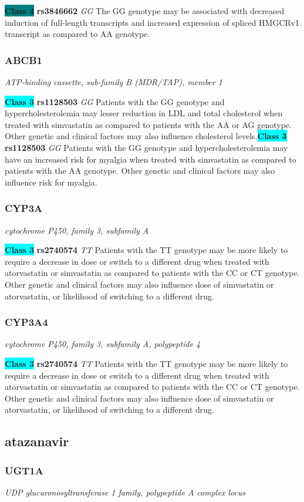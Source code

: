 \documentclass{report}
\begin{document}
\textbf{\colorbox{teal} {Class 4}} \textbf{ rs3846662 } \textit{ GG }
The GG genotype may be associated with decreased induction of full-length transcripts and increased expression of spliced HMGCRv1 transcript  as compared to AA genotype.\newline\subsubsection{ ABCB1 }
\textit{ ATP-binding cassette, sub-family B (MDR/TAP), member 1 }

\textbf{\colorbox{cyan} {Class 3}} \textbf{ rs1128503 } \textit{ GG }
Patients with the GG genotype and hypercholesterolemia may lesser reduction in LDL and total cholesterol when treated with simvastatin as compared to patients with the AA or AG genotype. Other genetic and clinical factors may also influence cholesterol levels.\newline\textbf{\colorbox{cyan} {Class 3}} \textbf{ rs1128503 } \textit{ GG }
Patients with the GG genotype and hypercholesterolemia may have an increased risk for myalgia when treated with simvastatin as compared to patients with the AA genotype. Other genetic and clinical factors may also influence risk for myalgia.\newline\subsubsection{ CYP3A }
\textit{ cytochrome P450, family 3, subfamily A }

\textbf{\colorbox{cyan} {Class 3}} \textbf{ rs2740574 } \textit{ TT }
Patients with the TT genotype may be more likely to require a decrease in dose or switch to a different drug when treated with atorvastatin or simvastatin as compared to patients with the CC or CT genotype. Other genetic and clinical factors may also influence dose of simvastatin or atorvastatin, or likelihood of switching to a different drug.\newline\subsubsection{ CYP3A4 }
\textit{ cytochrome P450, family 3, subfamily A, polypeptide 4 }

\textbf{\colorbox{cyan} {Class 3}} \textbf{ rs2740574 } \textit{ TT }
Patients with the TT genotype may be more likely to require a decrease in dose or switch to a different drug when treated with atorvastatin or simvastatin as compared to patients with the CC or CT genotype. Other genetic and clinical factors may also influence dose of simvastatin or atorvastatin, or likelihood of switching to a different drug.\newline\subsection{ atazanavir }\subsubsection{ UGT1A }
\textit{ UDP glucuronosyltransferase 1 family, polypeptide A complex locus }
\end{document}

